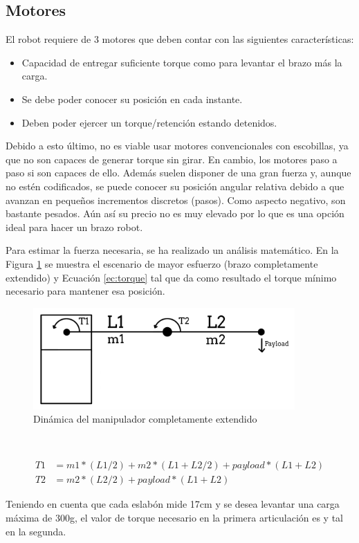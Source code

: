 \subsection{Motores}
\noindent El robot requiere de 3 motores que deben contar con las siguientes características:
\begin{itemize}
  \item Capacidad de entregar suficiente torque como para levantar el brazo más la carga.
  \item Se debe poder conocer su posición en cada instante.
  \item Deben poder ejercer un torque/retención estando detenidos.
\end{itemize}

Debido a esto último, no es viable usar motores convencionales con escobillas, ya que no son 
capaces de generar torque sin girar. En cambio, los motores paso a paso si son capaces de ello. Además 
suelen disponer de una gran fuerza y, aunque no estén codificados, se puede conocer su posición angular relativa debido a que avanzan en 
pequeños incrementos discretos (pasos). Como aspecto negativo, son bastante pesados. Aún así su precio no es muy elevado por lo que es 
una opción ideal para hacer un brazo robot. 

Para estimar la fuerza necesaria, se ha realizado un análisis matemático. En la Figura \ref{fig:torque} se muestra el 
escenario de mayor esfuerzo (brazo completamente extendido) y Ecuación \ref{ec:torque} tal que da como resultado 
el torque mínimo necesario para mantener esa posición.

\begin{figure} [ht!]
  \begin{center}
    \includegraphics[width=10cm]{figs/torque.jpeg}
  \end{center}
  \caption{Dinámica del manipulador completamente extendido}
  \label{fig:torque}
\end{figure}\ 


\begin{myequation}[h!]
  \begin{equation}
    \begin{aligned}
      T1 &= m1*(L1/2) + m2*(L1 + L2/2) + payload*(L1 + L2)\\
      T2 &= m2 *(L2/2) + payload*(L1 + L2)
  \nonumber
    \end{aligned}
  \end{equation}
  \caption[Cálculo del torque necesario en la articulación más demandante]{Cálculo del torque necesario en la articulación más demandante}
  \label{ec:torque}
\end{myequation} 
Teniendo en cuenta que cada eslabón mide 17cm y se desea levantar una carga máxima de 300g, el valor de 
torque necesario en la primera articulación es y tal en la segunda.

